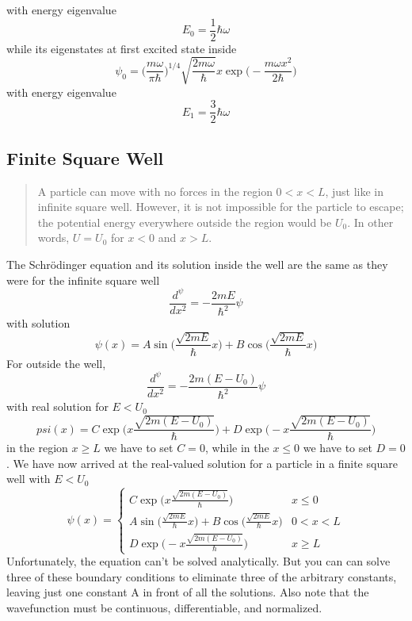 \documentclass[../main.tex]{subfiles}
\begin{document}
with energy eigenvalue
\begin{equation*}
    E_0=\frac{1}{2}\hbar\omega
\end{equation*}
while its eigenstates at first excited state inside
\begin{equation*}
    \psi_0=\biggl( \frac{m\omega}{\pi \hbar} \biggr)^{1/4}  \sqrt{\frac{2m\omega}{\hbar}}x \exp\biggl(-\frac{ m\omega x^2}{2\hbar}\biggr)
\end{equation*} 
with energy eigenvalue
\begin{equation*}
    E_1=\frac{3}{2}\hbar\omega
\end{equation*}

\subsection*{Finite Square Well}
\begin{quote}
    A particle can move with no forces in the region $0 < x < L$, just like in infinite square well. However, it is not impossible for the particle to escape; the potential energy everywhere outside the region would be $U_0$. In other words, $U=U_0$ for $x < 0$ and $x > L$.
\end{quote} 
The Schrödinger equation and its solution inside the well are the same as they were for the
infinite square well 
\begin{equation*}
    \frac{d^\psi}{dx^2}=-\frac{2mE}{\hbar^2}\psi
\end{equation*}
with solution
\begin{equation*}
    \psi(x)=A\sin \biggl(\frac{\sqrt{2mE}}{\hbar} x\biggr)+ B \cos \biggl(\frac{\sqrt{2mE}}{\hbar} x\biggr)
\end{equation*}
For outside the well,
\begin{equation*}
    \frac{d^\psi}{dx^2}=-\frac{2m(E-U_0)}{\hbar^2}\psi
\end{equation*}
with real solution for $E < U_0$
\begin{equation*}
    psi(x)=C\exp\biggl( x{\frac{\sqrt{2m(E-U_0)}}{\hbar}} \biggr)+D\exp\biggl( -x{\frac{\sqrt{2m(E-U_0)}}{\hbar}} \biggr)
\end{equation*}
in the region $x \geq L$ we have to set $C = 0$, while in the $x \leq 0$ we have to set $D = 0$.  We have now arrived at the real-valued solution for a particle in a finite square well with $E < U_0$
\begin{equation*}
    \psi(x)=\begin{cases}
        C\exp\biggl( x{\frac{\sqrt{2m(E-U_0)}}{\hbar}} \biggr)&x\leq 0\\
        A\sin \biggl(\frac{\sqrt{2mE}}{\hbar} x\biggr)+ B \cos \biggl(\frac{\sqrt{2mE}}{\hbar} x\biggr)& 0 < x < L\\
        D\exp\biggl( -x{\frac{\sqrt{2m(E-U_0)}}{\hbar}} \biggr)&x\geq L
    \end{cases}
\end{equation*}
Unfortunately, the equation can't be solved analytically. But you can can solve three of these boundary conditions to eliminate three of the arbitrary constants, leaving just one constant A in front of all the solutions. Also note that the wavefunction must be continuous, differentiable, and normalized.
\end{document}
